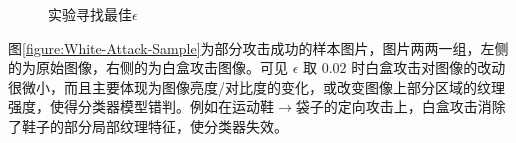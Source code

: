 \documentclass[journal, a4paper]{IEEEtran}
\begin{document}
\begin{figure}[t] 
    \centering
    \caption{实验寻找最佳$\epsilon$}\label{figure:White-Attack}
\end{figure}

图\ref{figure:White-Attack-Sample}为部分攻击成功的样本图片，图片两两一组，左侧的为原始图像，右侧的为白盒攻击图像。可见 $\epsilon$ 取 $0.02$ 时白盒攻击对图像的改动很微小，而且主要体现为图像亮度/对比度的变化，或改变图像上部分区域的纹理强度，使得分类器模型错判。例如在运动鞋$\to$袋子的定向攻击上，白盒攻击消除了鞋子的部分局部纹理特征，使分类器失效。
\end{document}
